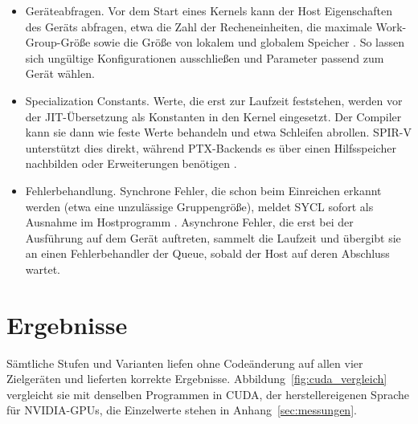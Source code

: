 \documentclass[12pt,a4paper]{article}
\begin{document}
\begin{itemize}[nosep]
    \item Geräteabfragen. Vor dem Start eines Kernels kann der Host
    Eigenschaften des Geräts abfragen, etwa die Zahl der Recheneinheiten, die
    maximale Work-Group-Größe sowie die Größe von lokalem und globalem Speicher
    \cite{khronos2020sycl}. So lassen sich ungültige Konfigurationen ausschließen
    und Parameter passend zum Gerät wählen.
    \item Specialization Constants. Werte, die erst zur Laufzeit
    feststehen, werden vor der JIT-Übersetzung als Konstanten in den Kernel
    eingesetzt. Der Compiler kann sie dann wie feste Werte behandeln und etwa
    Schleifen abrollen. SPIR-V unterstützt dies direkt, während PTX-Backends es
    über einen Hilfsspeicher nachbilden \cite{dpcpp_spec_const} oder
    Erweiterungen benötigen \cite{adaptivecpp_ext}.
    \item Fehlerbehandlung. Synchrone Fehler, die schon beim
    Einreichen erkannt werden (etwa eine unzulässige Gruppengröße), meldet SYCL
    sofort als Ausnahme im Hostprogramm \cite{reinders2023dpcpp}.
    Asynchrone Fehler, die erst bei der Ausführung auf dem Gerät
    auftreten, sammelt die Laufzeit und übergibt sie an einen Fehlerbehandler der
    Queue, sobald der Host auf deren Abschluss wartet.
\end{itemize}

\newpage
\section{Ergebnisse}\label{sec:ergebnisse}

Sämtliche Stufen und Varianten liefen ohne Codeänderung auf allen vier
Zielgeräten und lieferten korrekte Ergebnisse. Abbildung~\ref{fig:cuda_vergleich}
vergleicht sie mit denselben Programmen in CUDA, der herstellereigenen Sprache
für NVIDIA-GPUs, die Einzelwerte stehen in Anhang~\ref{sec:messungen}.
\end{document}
